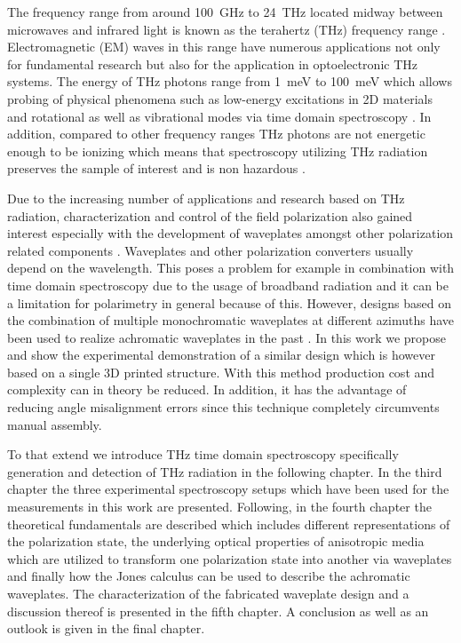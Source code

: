 The frequency range from around \SI{100}{\giga \hertz} to \SI{24}{\tera \hertz} located midway between microwaves and infrared light is known as the terahertz (THz) frequency range \cite{Jepsen2011}. Electromagnetic (EM) waves in this range have numerous applications not only for fundamental research but also for the application in optoelectronic THz systems. The energy of THz photons range from \SI{1}{\milli \electronvolt} to \SI{100}{\milli \electronvolt} which allows probing of physical phenomena such as low-energy excitations in 2D materials \cite{Winnerl2018} and rotational as well as vibrational modes via time domain spectroscopy \cite{Walther2002, Giesen2005, Baxter2011, Mittleman2003}. In addition, compared to other frequency ranges THz photons are not energetic enough to be ionizing which means that spectroscopy utilizing THz radiation preserves the sample of interest and is non hazardous \cite{Jepsen2011}.

Due to the increasing number of applications and research based on THz radiation, characterization and control of the field polarization also gained interest especially with the development of waveplates amongst other polarization related components \cite{Castro-Camus2012}. Waveplates and other polarization converters usually depend on the wavelength. This poses a problem for example in combination with time domain spectroscopy due to the usage of broadband radiation and it can be a limitation for polarimetry in general because of this. However, designs based on the combination of multiple monochromatic waveplates at different azimuths have been used to realize achromatic waveplates in the past \cite{Wu2020, Masson2006, Ivanov2012, Herrera-Fernandez2015}. In this work we propose and show the experimental demonstration of a similar design which is however based on a single 3D printed structure. With this method production cost and complexity can in theory be reduced. In addition, it has the advantage of reducing angle misalignment errors since this technique completely circumvents manual assembly.

To that extend we introduce THz time domain spectroscopy specifically generation and detection of THz radiation in the following chapter. In the third chapter the three experimental spectroscopy setups which have been used for the measurements in this work are presented. Following, in the fourth chapter the theoretical fundamentals are described which includes different representations of the polarization state, the underlying optical properties of anisotropic media which are utilized to transform one polarization state into another via waveplates and finally how the Jones calculus can be used to describe the achromatic waveplates. The characterization of the fabricated waveplate design and a discussion thereof is presented in the fifth chapter. A conclusion as well as an outlook is given in the final chapter.

